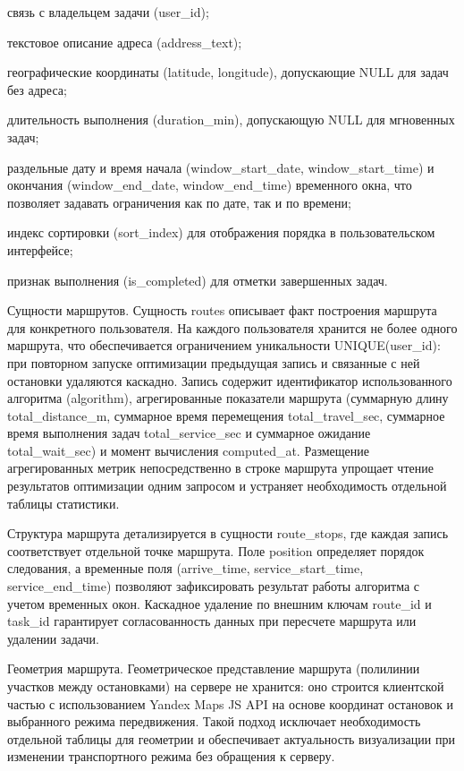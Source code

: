 \begin{compactlist}
  \item связь с владельцем задачи (user\_id);
  \item текстовое описание адреса (address\_text);
  \item географические координаты (latitude, longitude), допускающие NULL для задач без адреса;
  \item длительность выполнения (duration\_min), допускающую NULL для мгновенных задач;
  \item раздельные дату и время начала (window\_start\_date, window\_start\_time) и окончания (window\_end\_date, window\_end\_time) временного окна, что позволяет задавать ограничения как по дате, так и по времени;
  \item индекс сортировки (sort\_index) для отображения порядка в пользовательском интерфейсе;
  \item признак выполнения (is\_completed) для отметки завершенных задач.
\end{compactlist}

Сущности маршрутов. Сущность routes описывает факт построения маршрута для конкретного пользователя.
На каждого пользователя хранится не более одного маршрута, что обеспечивается ограничением уникальности UNIQUE(user\_id): при повторном запуске оптимизации предыдущая запись и связанные с ней остановки удаляются каскадно.
Запись содержит идентификатор использованного алгоритма (algorithm), агрегированные показатели маршрута (суммарную длину total\_distance\_m, суммарное время перемещения total\_travel\_sec, суммарное время выполнения задач total\_service\_sec и суммарное ожидание total\_wait\_sec) и момент вычисления computed\_at.
Размещение агрегированных метрик непосредственно в строке маршрута упрощает чтение результатов оптимизации одним запросом и устраняет необходимость отдельной таблицы статистики.

Структура маршрута детализируется в сущности route\_stops,
где каждая запись соответствует отдельной точке маршрута.
Поле position определяет порядок следования,
а временные поля (arrive\_time, service\_start\_time, service\_end\_time)
позволяют зафиксировать результат работы алгоритма с учетом временных окон.
Каскадное удаление по внешним ключам route\_id и task\_id гарантирует согласованность данных при пересчете маршрута или удалении задачи.

Геометрия маршрута. Геометрическое представление маршрута (полилинии участков между остановками) на сервере не хранится: оно строится клиентской частью с использованием Yandex Maps JS API на основе координат остановок и выбранного режима передвижения.
Такой подход исключает необходимость отдельной таблицы для геометрии и обеспечивает актуальность визуализации при изменении транспортного режима без обращения к серверу.

